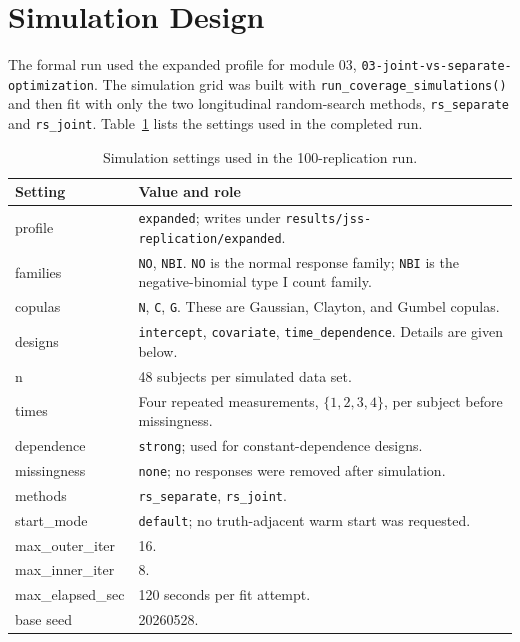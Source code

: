 \documentclass[11pt]{article}
\begin{document}
\section{Simulation Design}

The formal run used the expanded profile for module 03,
\texttt{03-joint-vs-separate-optimization}.  The simulation grid was built
with \texttt{run\_coverage\_simulations()} and then fit with only the two
longitudinal random-search methods, \texttt{rs\_separate} and
\texttt{rs\_joint}.  Table~\ref{tab:settings} lists the settings used in the
completed run.

\begin{table}[ht]
\centering
\caption{Simulation settings used in the 100-replication run.}
\label{tab:settings}
\begin{tabular}{>{\ttfamily}ll}
\toprule
Setting & Value and role \\
\midrule
profile & \texttt{expanded}; writes under \texttt{results/jss-replication/expanded}. \\
families & \texttt{NO}, \texttt{NBI}. \texttt{NO} is the normal response family; \texttt{NBI} is the negative-binomial type I count family. \\
copulas & \texttt{N}, \texttt{C}, \texttt{G}. These are Gaussian, Clayton, and Gumbel copulas. \\
designs & \texttt{intercept}, \texttt{covariate}, \texttt{time\_dependence}. Details are given below. \\
n & 48 subjects per simulated data set. \\
times & Four repeated measurements, \(\{1,2,3,4\}\), per subject before missingness. \\
dependence & \texttt{strong}; used for constant-dependence designs. \\
missingness & \texttt{none}; no responses were removed after simulation. \\
methods & \texttt{rs\_separate}, \texttt{rs\_joint}. \\
start\_mode & \texttt{default}; no truth-adjacent warm start was requested. \\
max\_outer\_iter & 16. \\
max\_inner\_iter & 8. \\
max\_elapsed\_sec & 120 seconds per fit attempt. \\
base seed & 20260528. \\
\bottomrule
\end{tabular}
\end{table}
\end{document}
